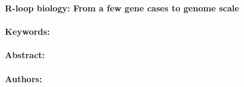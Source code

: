 \noindent
\large {\bf R-loop biology: From a few gene cases to genome scale} 


\normalsize 


\noindent \paragraph{Keywords:} 

\noindent \paragraph{Abstract:} 



\noindent \paragraph{Authors:} 


